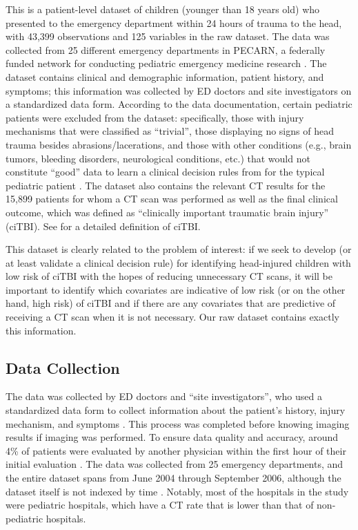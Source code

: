 \documentclass[10pt,letterpaper]{article}
\begin{document}
This is a patient-level dataset of children (younger than 18 years old) who presented to the emergency department within 24 hours of trauma to the head, with 43,399 observations and 125 variables in the raw dataset.
The data was collected from 25 different emergency departments in PECARN, a federally funded network for conducting pediatric emergency medicine research \cite{pecarn}. The dataset
contains clinical and demographic information, patient history, and symptoms; this information was collected by ED doctors and site investigators on a standardized data form. According to the data documentation,
certain pediatric patients were excluded from the dataset: specifically, those with injury mechanisms that were classified as ``trivial'', those displaying no signs of head trauma besides abrasions/lacerations, and those with other
conditions (e.g., brain tumors, bleeding disorders, neurological conditions, etc.) that would not constitute ``good'' data to learn a clinical decision rules from for the typical pediatric patient \cite{Kuppermann2009}.
The dataset also contains the relevant CT results for the 15,899 patients for whom a CT scan was performed as well as the final clinical outcome, which was defined as ``clinically important traumatic brain injury'' (ciTBI).
See \cite{Kuppermann2009} for a detailed definition of ciTBI.

This dataset is clearly related to the problem of interest: if we seek to develop (or at least validate a clinical decision rule) for identifying head-injured children with low risk of ciTBI with the hopes of reducing unnecessary CT scans, it will be important to identify
which covariates are indicative of low risk (or on the other hand, high risk) of ciTBI and if there are any covariates that are predictive of receiving a CT scan when it is not necessary. Our raw dataset contains exactly this information.

\subsection{Data Collection}\label{data-collection}

The data was collected by ED doctors and ``site investigators'', who used a standardized data form to collect information about the patient's history, injury mechanism, and symptoms \cite{Kuppermann2009}.
This process was completed before knowing imaging results if imaging was performed. To ensure data quality and accuracy, around 4\% of patients were evaluated by another physician within the first hour of their
initial evaluation \cite{Kuppermann2009}. The data was collected from 25 emergency departments, and the entire dataset spans from June 2004 through September 2006, although the dataset itself is not indexed by time \cite{Kuppermann2009}. Notably, most of the
hospitals in the study were pediatric hospitals, which have a CT rate that is lower than that of non-pediatric hospitals.
\end{document}
